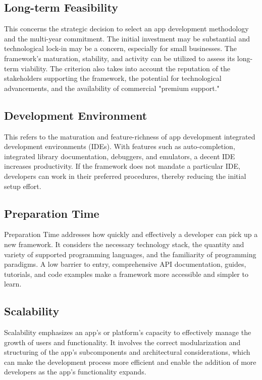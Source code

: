 \subsection{Long-term Feasibility}
This concerns the strategic decision to select an app development methodology and the multi-year commitment. The initial investment may be substantial and technological lock-in may be a concern, especially for small businesses. The framework's maturation, stability, and activity can be utilized to assess its long-term viability. The criterion also takes into account the reputation of the stakeholders supporting the framework, the potential for technological advancements, and the availability of commercial "premium support."

\subsection{Development Environment}
This refers to the maturation and feature-richness of app development integrated development environments (IDEs). With features such as auto-completion, integrated library documentation, debuggers, and emulators, a decent IDE increases productivity. If the framework does not mandate a particular IDE, developers can work in their preferred procedures, thereby reducing the initial setup effort.

\subsection{Preparation Time}
Preparation Time addresses how quickly and effectively a developer can pick up a new framework. It considers the necessary technology stack, the quantity and variety of supported programming languages, and the familiarity of programming paradigms. A low barrier to entry, comprehensive API documentation, guides, tutorials, and code examples make a framework more accessible and simpler to learn.

\subsection{Scalability}
Scalability emphasizes an app's or platform's capacity to effectively manage the growth of users and functionality. It involves the correct modularization and structuring of the app's subcomponents and architectural considerations, which can make the development process more efficient and enable the addition of more developers as the app's functionality expands.


